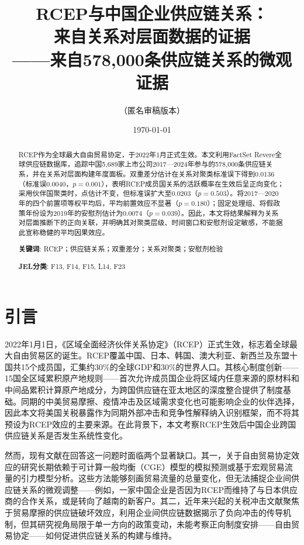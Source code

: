 \documentclass[12pt,a4paper]{ctexart}
\title{RCEP与中国企业供应链关系：\\来自关系对层面数据的证据\\[6pt]
\large ——来自578,000条供应链关系的微观证据}
\author{（匿名审稿版本）}
\date{\today}
\begin{document}
\maketitle


\begin{abstract}
\noindent
RCEP作为全球最大自由贸易协定，于2022年1月正式生效。本文利用FactSet Revere全球供应链数据库，追踪中国5,689家上市公司2017—2024年参与的578,000条供应链关系，并在关系对层面构建年度面板。双重差分估计在关系对聚类标准误下得到0.0136（标准误0.0040，$p=0.001$），表明RCEP成员国关系的活跃概率在生效后呈正向变化；采用伙伴国聚类时，点估计不变，但标准误扩大至0.0203（$p=0.503$）。将2017—2020年的四个前置项等权平均后，平均前置效应不显著（$p=0.180$）；固定处理组、将假政策年份设为2019年的安慰剂估计为0.0074（$p=0.039$）。因此，本文将结果解释为关系对层面推断下的正向关联，并明确其对聚类层级、时间窗口和安慰剂设定敏感，不能据此宣称稳健的平均因果效应。

\vspace{6pt}
\noindent\textbf{关键词}: RCEP；供应链关系；双重差分；关系对聚类；安慰剂检验

\noindent\textbf{JEL分类}: F13, F14, F15, L14, F23
\end{abstract}


\section{引言}

2022年1月1日，《区域全面经济伙伴关系协定》（RCEP）正式生效，标志着全球最大自由贸易区的诞生。RCEP覆盖中国、日本、韩国、澳大利亚、新西兰及东盟十国共15个成员国，汇集约30\%的全球GDP和30\%的世界人口。其核心制度创新——15国全区域累积原产地规则——首次允许成员国企业将区域内任意来源的原材料和中间品累积计算原产地成分，为跨国供应链在亚太地区的深度整合提供了制度基础。同期的中美贸易摩擦、疫情冲击及区域需求变化也可能影响企业的伙伴选择，因此本文将美国关税暴露作为同期外部冲击和竞争性解释纳入识别框架，而不将其预设为RCEP效应的主要来源。在此背景下，本文考察RCEP生效后中国企业跨国供应链关系是否发生系统性变化。

然而，现有文献在回答这一问题时面临两个显著缺口。其一，关于自由贸易协定效应的研究长期依赖于可计算一般均衡（CGE）模型的模拟预测或基于宏观贸易流量的引力模型分析\citep{petri2020east,baier2007free}。这些方法能够刻画贸易流量的总量变化，但无法捕捉企业间供应链关系的微观调整——例如，一家中国企业是否因为RCEP而维持了与日本供应商的合作关系，或是转向了越南的新客户。其二，近年来兴起的关税冲击文献\citep{ding2024trade,difan2022impact,alfaro2023global,crosignani2022pirates}聚焦于贸易摩擦的供应链破坏效应，利用企业间供应链数据揭示了负向冲击的传导机制，但其研究视角局限于单一方向的政策变动，未能考察正向制度安排——自由贸易协定——如何促进供应链关系的构建与维持。
\end{document}
